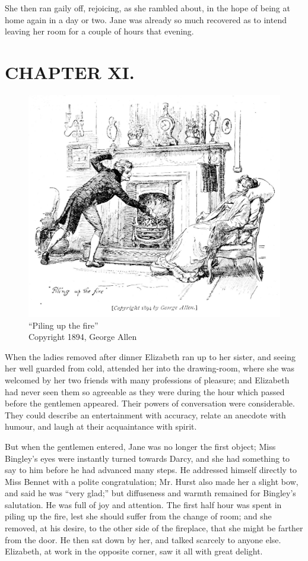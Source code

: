 She then ran gaily off, rejoicing, as she rambled about, in the hope of being at home again in a day or two. Jane was already so much recovered as to intend leaving her room for a couple of hours that evening.



\chapter{CHAPTER XI.}

\begin{figure}[htbp]
    \centering
    \includegraphics[width=\textwidth]{illustrations/i_098_a.jpg}
    \caption{“Piling up the fire”\\ Copyright 1894, George Allen}
    \label{fig:image}
\end{figure}


When the ladies removed after dinner Elizabeth ran up to her sister, and seeing her well guarded from cold, attended her into the drawing-room, where she was welcomed by her two friends with many professions of pleasure; and Elizabeth had never seen them so agreeable as they were during the hour which passed before the gentlemen appeared. Their powers of conversation were considerable. They could describe an entertainment with accuracy, relate an anecdote with humour, and laugh at their acquaintance with spirit.

But when the gentlemen entered, Jane was no longer the first object; Miss Bingley's eyes were instantly turned towards Darcy, and she had something to say to him before he had advanced many steps. He addressed himself directly to Miss Bennet with a polite congratulation; Mr. Hurst also made her a slight bow, and said he was ``very glad;'' but diffuseness and warmth remained for Bingley's salutation. He was full of joy and attention. The first half hour was spent in piling up the fire, lest she should suffer from the change of room; and she removed, at his desire, to the other side of the fireplace, that she might be farther from the door. He then sat down by her, and talked scarcely to anyone else. Elizabeth, at work in the opposite corner, saw it all with great delight.

